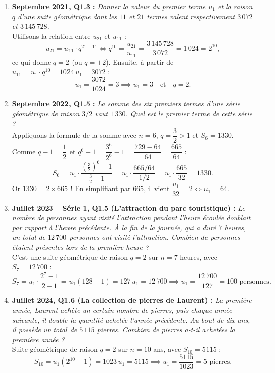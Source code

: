 \begin{exemple}
\begin{enumerate}
    \item \textbf{Septembre 2021, Q1.3 :} \emph{Donner la valeur du premier terme $u_1$ et la raison $q$ d'une suite géométrique dont les $11$\ieme{} et $21$\ieme{} termes valent respectivement $3\,072$ et $3\,145\,728$.}\\
    Utilisons la relation entre $u_{21}$ et $u_{11}$ :
    \[
        u_{21} = u_{11} \cdot q^{21-11} \iff q^{10} = \frac{u_{21}}{u_{11}} = \frac{3\,145\,728}{3\,072} = 1\,024 = 2^{10},
    \]
    ce qui donne $q = 2$ (ou $q = \pm 2$). Ensuite, à partir de $u_{11} = u_1 \cdot q^{10} = 1024\,u_1 = 3072$ :
    \[
        u_1 = \frac{3072}{1024} = 3 \implies \boxed{u_1 = 3 \quad \text{et} \quad q = 2}.
    \]

    \item \textbf{Septembre 2022, Q1.5 :} \emph{La somme des six premiers termes d'une série géométrique de raison $3/2$ vaut $1\,330$. Quel est le premier terme de cette série ?}\\
    Appliquons la formule de la somme avec $n = 6$, $q = \dfrac{3}{2} > 1$ et $S_6 = 1330$. Comme $q - 1 = \dfrac{1}{2}$ et $q^6 - 1 = \dfrac{3^6}{2^6} - 1 = \dfrac{729 - 64}{64} = \dfrac{665}{64}$ :
    \[
        S_6 = u_1 \cdot \frac{\left(\frac{3}{2}\right)^6 - 1}{\frac{3}{2} - 1} = u_1 \cdot \frac{665 / 64}{1 / 2} = u_1 \cdot \frac{665}{32} = 1330.
    \]
    Or $1330 = 2 \times 665$ ! En simplifiant par $665$, il vient $\dfrac{u_1}{32} = 2 \iff \boxed{u_1 = 64}$.

    \item \textbf{Juillet 2023 -- Série 1, Q1.5 (L'attraction du parc touristique) :} \emph{Le nombre de personnes ayant visité l'attraction pendant l'heure écoulée doublait par rapport à l'heure précédente. À la fin de la journée, qui a duré $7$ heures, un total de $12\,700$ personnes ont visité l'attraction. Combien de personnes étaient présentes lors de la première heure ?}\\
    C'est une suite géométrique de raison $q = 2$ sur $n = 7$ heures, avec $S_7 = 12\,700$ :
    \[
        S_7 = u_1 \cdot \frac{2^7 - 1}{2 - 1} = u_1(128 - 1) = 127\,u_1 = 12\,700 \implies \boxed{u_1 = \frac{12\,700}{127} = 100\text{ personnes}}.
    \]

    \item \textbf{Juillet 2024, Q1.6 (La collection de pierres de Laurent) :} \emph{La première année, Laurent achète un certain nombre de pierres, puis chaque année suivante, il double la quantité achetée l'année précédente. Au bout de dix ans, il possède un total de $5\,115$ pierres. Combien de pierres a-t-il achetées la première année ?}\\
    Suite géométrique de raison $q = 2$ sur $n = 10$ ans, avec $S_{10} = 5115$ :
    \[
        S_{10} = u_1(2^{10} - 1) = 1023\,u_1 = 5115 \implies \boxed{u_1 = \frac{5115}{1023} = 5\text{ pierres}}.
    \]


\end{enumerate}
\end{exemple}
